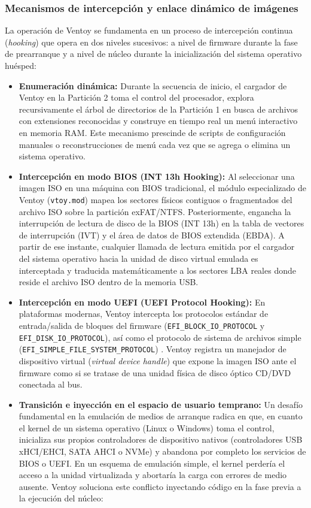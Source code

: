 \documentclass[12pt]{article}
\begin{document}
\subsubsection{Mecanismos de intercepción y enlace dinámico de imágenes}

La operación de Ventoy se fundamenta en un proceso de intercepción continua (\textit{hooking}) que opera en dos niveles sucesivos: a nivel de firmware durante la fase de prearranque y a nivel de núcleo durante la inicialización del sistema operativo huésped:
\begin{itemize}[noitemsep, topsep=2pt]
    \item \textbf{Enumeración dinámica:} Durante la secuencia de inicio, el cargador de Ventoy en la Partición 2 toma el control del procesador, explora recursivamente el árbol de directorios de la Partición 1 en busca de archivos con extensiones reconocidas y construye en tiempo real un menú interactivo en memoria RAM. Este mecanismo prescinde de scripts de configuración manuales o reconstrucciones de menú cada vez que se agrega o elimina un sistema operativo.
    \item \textbf{Intercepción en modo BIOS (INT 13h Hooking):} Al seleccionar una imagen ISO en una máquina con BIOS tradicional, el módulo especializado de Ventoy (\texttt{vtoy.mod}) mapea los sectores físicos contiguos o fragmentados del archivo ISO sobre la partición exFAT/NTFS. Posteriormente, engancha la interrupción de lectura de disco de la BIOS (INT 13h) en la tabla de vectores de interrupción (IVT) y el área de datos de BIOS extendida (EBDA). A partir de ese instante, cualquier llamada de lectura emitida por el cargador del sistema operativo hacia la unidad de disco virtual emulada es interceptada y traducida matemáticamente a los sectores LBA reales donde reside el archivo ISO dentro de la memoria USB.
    \item \textbf{Intercepción en modo UEFI (UEFI Protocol Hooking):} En plataformas modernas, Ventoy intercepta los protocolos estándar de entrada/salida de bloques del firmware (\texttt{EFI\_BLOCK\_IO\_PROTOCOL} y \texttt{EFI\_DISK\_IO\_PROTOCOL}), así como el protocolo de sistema de archivos simple (\texttt{EFI\_SIMPLE\_FILE\_SYSTEM\_PROTOCOL}) \parencite{uefi2024specification}. Ventoy registra un manejador de dispositivo virtual (\textit{virtual device handle}) que expone la imagen ISO ante el firmware como si se tratase de una unidad física de disco óptico CD/DVD conectada al bus.
    \item \textbf{Transición e inyección en el espacio de usuario temprano:} Un desafío fundamental en la emulación de medios de arranque radica en que, en cuanto el kernel de un sistema operativo (Linux o Windows) toma el control, inicializa sus propios controladores de dispositivo nativos (controladores USB xHCI/EHCI, SATA AHCI o NVMe) y abandona por completo los servicios de BIOS o UEFI. En un esquema de emulación simple, el kernel perdería el acceso a la unidad virtualizada y abortaría la carga con errores de medio ausente. Ventoy soluciona este conflicto inyectando código en la fase previa a la ejecución del núcleo:

\end{itemize}
\end{document}
